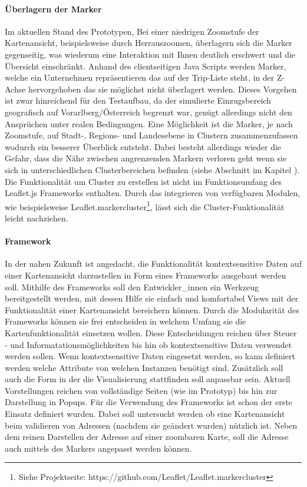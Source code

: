 \documentclass[Bachelorarbeit.tex]{subfiles}
\begin{document}
\paragraph{Überlagern der Marker}
Im aktuellen Stand des Prototypen, 
Bei einer niedrigen Zoomstufe der Kartenansicht, beispielsweise durch Herrauszoomen, überlagern sich die Marker gegenseitig, was wiederum eine Interaktion mit Ihnen deutlich erschwert und die Übersicht einschränkt.
Anhand des clientseitigen Java Scripts werden Marker, welche ein Unternehmen repräsentieren das auf der Trip-Liste steht, in der Z-Achse hervorgehoben das sie möglichst nicht überlagert werden.
Dieses Vorgehen ist zwar hinreichend für den Testaufbau, da der simulierte Einzugsbereich geografisch auf Vorarlberg/Österreich begrenzt war, genügt allerdings nicht den Ansprüchen unter realen Bedingungen.
Eine Möglichkeit ist die Marker, je nach Zoomstufe, auf Stadt-, Regions- und Landesebene in Clustern zusammenzufassen wodurch ein besserer Überblick entsteht.
Dabei besteht allerdings wieder die Gefahr, dass die Nähe zwischen angrenzenden Markern verloren geht wenn sie sich in unterschiedlichen Clusterbereichen befinden (siehe Abschnitt  im Kapitel ).
Die Funktionalität um Cluster zu erstellen ist nicht im Funktionsumfang des Leaflet.js Frameworks enthalten.
Durch das integrieren von verfügbaren Modulen, wie beispielsweise Leaflet.markercluster\footnote{Siehe Projektseite: https://github.com/Leaflet/Leaflet.markercluster}, lässt sich die Cluster-Funktionalität leicht nachziehen.

\paragraph{Framework}
In der nahen Zukunft ist angedacht, die Funktionalität kontextsensitive Daten auf einer Kartenansicht darzustellen in Form eines Frameworks ausgebaut werden soll.
Mithilfe des Frameworks soll den Entwickler\_innen ein Werkzeug bereitgestellt werden, mit dessen Hilfe sie einfach und komfortabel Views mit der Funktionalität einer Kartenansicht bereichern können.
Durch die Modularität des Frameworks können sie frei entscheiden in welchem Umfang sie die Kartenfunktionalität einsetzen wollen.
Diese Entscheidungen reichen über Steuer - und Informatationsmöglichkeiten bis hin ob kontextsensitive Daten verwendet werden sollen.
Wenn kontextsensitive Daten eingesetzt werden, so kann definiert werden welche Attribute von welchen Instanzen benötigt sind.
Zusätzlich soll auch die Form in der die Visualisierung stattfinden soll anpassbar sein.
Aktuell Vorstellungen reichen von vollständige Seiten (wie im Prototyp) bis hin zur Darstellung in Popups.  
Für die Verwendung des Frameworks ist schon der erste Einsatz definiert wurden.
Dabei soll untersucht werden ob eine Kartenansicht beim validieren von Adressen (nachdem sie geändert wurden) nützlich ist.
Neben dem reinen Darstellen der Adresse auf einer zoombaren Karte, soll die Adresse auch mittels des Markers angepasst werden können. 
  
\end{document}
